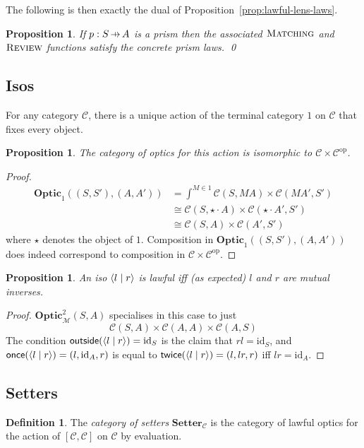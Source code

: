 \documentclass[11pt,letterpaper]{article}
\theoremstyle{plain}
\newtheorem{proposition}[theorem]{Proposition}
\theoremstyle{definition}
\newtheorem{definition}[theorem]{Definition}
\newcommand{\C}{\mathscr{C}}
\newcommand{\M}{\mathscr{M}}
\newcommand{\Optic}{\mathbf{Optic}}
\newcommand{\Twoptic}{\mathbf{Optic}^2}
\newcommand{\Setter}{\mathbf{Setter}}
\newcommand{\id}{\mathrm{id}}
\newcommand{\op}{\mathrm{op}}
\newcommand{\rep}[2]{{\ensuremath \left\langle #1 \mid #2 \right\rangle}}
\newcommand{\freview}{\textsc{Review}}
\newcommand{\fmatching}{\textsc{Matching}}
\newcommand{\outside}{\mathsf{outside}}
\newcommand{\once}{\mathsf{once}}
\newcommand{\twice}{\mathsf{twice}}
\newcommand{\hto}{\ensuremath{\,\mathaccent\shortmid\rightarrow\,}}
\begin{document}
The following is then exactly the dual of Proposition~\ref{prop:lawful-lens-laws}.
\begin{proposition}\label{prop:lawful-prism-laws}
  If $p : S \hto A$ is a prism then the associated $\fmatching$ and $\freview$ functions satisfy the concrete prism laws. \qed
\end{proposition}

\subsection{Isos}

For any category $\C$, there is a unique action of the terminal category $1$ on $\C$ that fixes every object.

\begin{proposition}
  The category of optics for this action is isomorphic to $\C \times \C^\op$.
\end{proposition}
\begin{proof}
  \begin{align*}
    \Optic_1((S, S'), (A, A')) &= \int^{M \in 1} \C(S, MA) \times \C(MA', S') \\
                               &\cong \C(S, \star \cdot A) \times \C(\star \cdot A', S') \\
                               &\cong \C(S, A) \times \C(A', S')
  \end{align*}
  where $\star$ denotes the object of $1$. Composition in $\Optic_1((S, S'), (A, A'))$ does indeed correspond to composition in $\C \times \C^\op$.
\end{proof}

\begin{proposition}
  An iso $\rep{l}{r}$ is lawful iff (as expected) $l$ and $r$ are mutual inverses.
\end{proposition}
\begin{proof}
$\Twoptic_\M(S, A)$ specialises in this case to just
  \[ \C(S, A) \times \C(A, A) \times \C(A, S) \]
  The condition $\outside(\rep{l}{r}) = \id_S$ is the claim that $rl = \id_S$, and $\once(\rep{l}{r}) = (l, \id_A, r)$ is equal to $\twice(\rep{l}{r}) = (l, lr, r)$ iff $lr = \id_A$.
\end{proof}

\subsection{Setters}\label{sec:setters}

\begin{definition}
  The \emph{category of setters} $\Setter_\C$ is the category of lawful optics for the action of $[\C, \C]$ on $\C$ by evaluation.
\end{definition}
\end{document}
